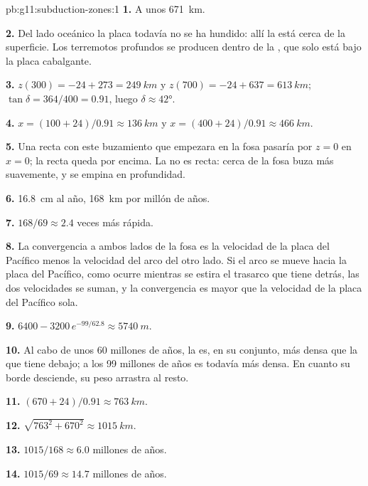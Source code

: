 \begin{solution}{pb:g11:subduction-zones:1}
\textbf{1.} A unos \qty{671}{km}.

\textbf{2.} Del lado oceánico la placa todavía no se ha hundido: allí la
 está cerca de la superficie. Los terremotos profundos se producen
dentro de la , que solo está bajo la placa cabalgante.

\textbf{3.} $z(300) = -24 + 273 = \qty{249}{km}$ y
$z(700) = -24 + 637 = \qty{613}{km}$; $\tan\delta = 364/400 = 0.91$, luego
$\delta \approx \ang{42}$.

\textbf{4.} $x = (100 + 24)/0.91 \approx \qty{136}{km}$ y
$x = (400 + 24)/0.91 \approx \qty{466}{km}$.

\textbf{5.} Una recta con este buzamiento que empezara en la fosa pasaría por
$z = 0$ en $x = 0$; la recta queda por encima. La  no es recta: cerca de la
fosa buza más suavemente, y se empina en profundidad.

\textbf{6.} \qty{16.8}{cm} al año, \qty{168}{km} por millón de años.

\textbf{7.} $168/69 \approx 2.4$ veces más rápida.

\textbf{8.} La convergencia a ambos lados de la fosa es la velocidad de la
placa del Pacífico menos la velocidad del arco del otro lado. Si el arco se
mueve hacia la placa del Pacífico, como ocurre mientras se estira el trasarco
que tiene detrás, las dos velocidades se suman, y la convergencia es mayor que
la velocidad de la placa del Pacífico sola.

\textbf{9.} $6400 - 3200\,e^{-99/62.8} \approx \qty{5740}{m}$.

\textbf{10.} Al cabo de unos 60 millones de años, la  es, en
su conjunto, más densa que la  que tiene debajo; a los 99 millones
de años es todavía más densa. En cuanto su borde desciende, su peso arrastra
al resto.

\textbf{11.} $(670 + 24)/0.91 \approx \qty{763}{km}$.

\textbf{12.} $\sqrt{763^2 + 670^2} \approx \qty{1015}{km}$.

\textbf{13.} $1015/168 \approx 6.0$ millones de años.

\textbf{14.} $1015/69 \approx 14.7$ millones de años.


\end{solution}

